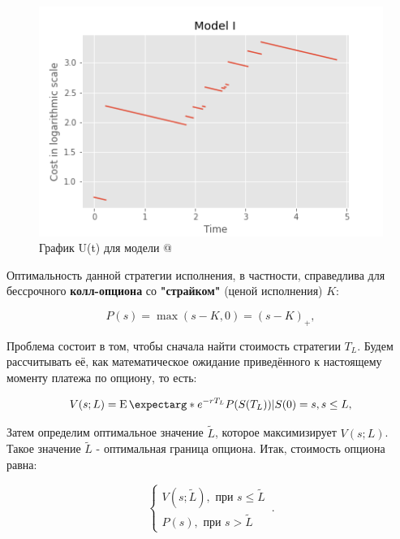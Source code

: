 \documentclass[a4paper,12pt]{article}
\makeatletter
\theoremstyle{definition}
\newcommand*{\rom}[1]{\expandafter\@slowromancap\romannumeral #1@}
\newcommand{\expect}{\operatorname{E}\expectarg}
\makeatother
\begin{document}

\begin{figure}[htbp]
\label{fig:model1track}
\centerline{\includegraphics[scale=0.7]{img/model1.png}}
\caption{График U(t) для модели \rom{1}}
\end{figure}

Оптимальность данной стратегии исполнения, в частности, справедлива для бессрочного \textbf{колл-опциона} со \textbf{"страйком"} (ценой исполнения) $K$:

\begin{equation}\label{eq:payoff_function}
P(s) = \max(s - K, 0) = (s - K)_+,
\end{equation}

Проблема состоит в том, чтобы сначала найти стоимость стратегии $T_L$. Будем рассчитывать её, как математическое ожидание приведённого к настоящему моменту платежа по опциону, то есть:

\begin{equation}\label{eq:strategy_cost}
V(s; L) = \expect*{e^{-rT_L} P(S(T_L)) | S(0) = s}, s \le L,
\end{equation}

Затем определим оптимальное значение $\widetilde{L}$, которое максимизирует $V(s; L)$. Такое значение $\widetilde{L}$ - оптимальная граница опциона. Итак, стоимость опциона равна:

\begin{equation}\label{eq:option_price}
    \begin{cases}
      V(s; \widetilde{L}), \text{ при } s \le \widetilde{L}\\
      P(s), \text{ при } s > \widetilde{L}
    \end{cases}\,.
\end{equation}
\end{document}
